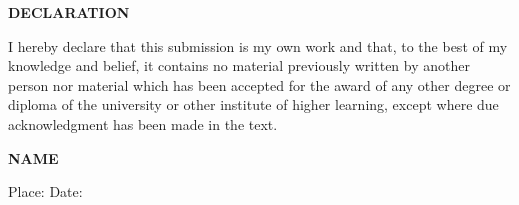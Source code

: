 \documentclass[a4paper,12pt,oneside]{report}  %
\begin{document}
\begin{titlepage}
{\scshape \centering \Large \bfseries DECLARATION \par}
\vspace{1.5cm}
{ I hereby declare that this submission is my own work and that, to the best of my knowledge and belief, it contains no material previously written by another person nor material which has been accepted for the award of any other degree or diploma of the university or other institute of higher learning, except where due acknowledgment has been made in the text.}
\vspace{2cm}
\begin{flushright}
    \textbf{NAME }
    
\end{flushright}

\begin{flushright}
    \textbf{MUT19CS000} }
    
\end{flushright}
\newline
\vspace{2cm}
{\noindent Place: \newline \noindent Date:}
\end{titlepage}
\end{document}
